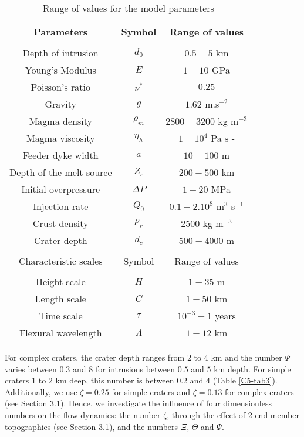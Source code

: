 \begin{table}[h!]
  \caption{Range of values for the model parameters}
  \centering
  \begin{tabular}{c|c|c}
    \hline
    Parameters& Symbol & Range of values \\
    \hline
              &&\\
    Depth of intrusion & $d_0$ & $0.5-5$ km \\
    Young's Modulus & $E$ & $1-10$ GPa \\
    Poisson's ratio & $\nu^*$ & $0.25$ \\
    Gravity & $g$ & $1.62$ m.s$^{-2}$ \\
    Magma density & $\rho_{m}$ & $2800-3200$ kg m$^{-3}$ \\
    Magma viscosity & $\eta_h $ & $1-10^{4}$ Pa s -\\
    Feeder dyke width & $ a$ & $10-100$ m \\
    Depth of the melt source & $Z_{c}$ & $ 200-500$ km \\ 
    Initial overpressure & $\Delta P$ & $1-20$ MPa \\
    Injection rate & $Q_{0}$ &$0.1-2.10^8$ m$^{3}$ s$^{-1}$ \\
    Crust density & $\rho_r$ & $2500$ kg m$^{-3}$ \\
    Crater depth & $d_{c}$ & $500-4000$ m \\
              &&\\
    \hline
    Characteristic scales & Symbol & Range of values \\
    \hline
              &&\\
    Height scale & $H$& $1-35$ m \\
    Length scale & $C$    & $1-50$ km \\
    Time scale & $\tau$ & $10^{-3}-1$ years \\
    Flexural wavelength & $\Lambda$ & $1-12$ km 
                                      \label{C5-tab2}
  \end{tabular} 
\end{table}
	 
For complex  craters, the crater depth  ranges from $2$ to  $4$ km and
the number $\Psi$ varies between  $0.3$ and $8$ for intrusions between
$0.5$ and $5$  km depth. For simple  craters $1$ to $2$  km deep, this
number is between $0.2$  and $4$ (Table \ref{C5-tab3}).  Additionally,
we use  $\zeta=0.25$ for simple  craters and $\zeta=0.13$  for complex
craters (see Section 3.1). Hence, we investigate the influence of four
dimensionless  numbers  on  the  flow dynamics:  the  number  $\zeta$,
through the effect of 2 end-member topographies (see Section 3.1), and
the numbers $\Xi$, $\Theta$ and $\Psi$.
	
